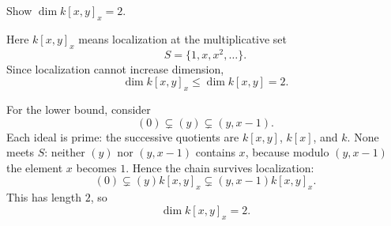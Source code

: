 \begin{problem}\label{prob:vi29-13}
Show \(\dim k[x,y]_x=2\).

\end{problem}

\ifdefined\FullProblemDossiers
\begin{solution}
Here \(k[x,y]_x\) means localization at the multiplicative set
\[
S=\{1,x,x^2,\ldots\}.
\]
Since localization cannot increase dimension,
\[
\dim k[x,y]_x\le\dim k[x,y]=2.
\]

For the lower bound, consider
\[
(0)\subsetneq(y)\subsetneq(y,x-1).
\]
Each ideal is prime: the successive quotients are \(k[x,y]\), \(k[x]\), and \(k\).  None meets \(S\): neither
\((y)\) nor \((y,x-1)\) contains \(x\), because modulo \((y,x-1)\) the element \(x\) becomes \(1\).  Hence the
chain survives localization:
\[
(0)\subsetneq(y)k[x,y]_x\subsetneq(y,x-1)k[x,y]_x.
\]
This has length \(2\), so
\[
\boxed{\dim k[x,y]_x=2}.
\]
\end{solution}
\fi
